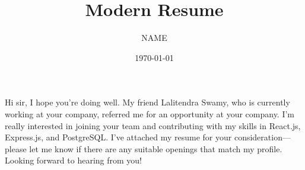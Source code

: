 \documentclass{article}
\title{Modern Resume}
\author{{{NAME}}}
\date{\today}
\begin{document}
\maketitle

Hi sir, I hope you're doing well. My friend Lalitendra Swamy, who is currently working at your company, referred me for an opportunity at your company. I'm really interested in joining your team and contributing with my skills in React.js, Express.js, and PostgreSQL. I've attached my resume for your consideration—please let me know if there are any suitable openings that match my profile. Looking forward to hearing from you!
\end{document}
